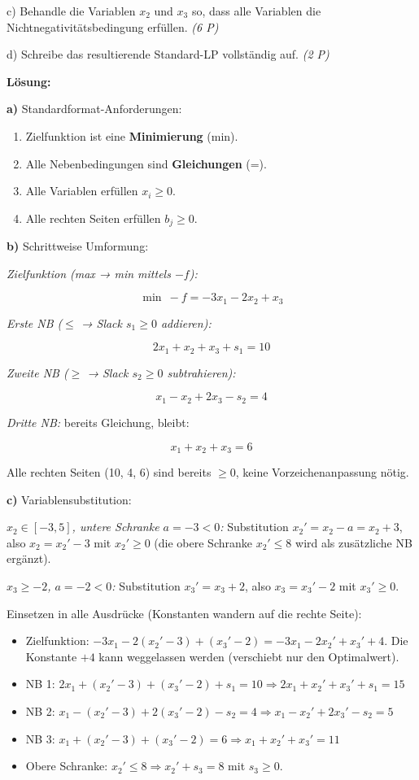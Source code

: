 \documentclass[11pt, a4paper]{article}
\begin{document}
c) Behandle die Variablen $x_2$ und $x_3$ so, dass alle Variablen die Nichtnegativitätsbedingung erfüllen. \textit{(6 P)}

d) Schreibe das resultierende Standard-LP vollständig auf. \textit{(2 P)}


\textbf{Lösung:}


\textbf{a)} Standardformat-Anforderungen:

\begin{enumerate}
  \item Zielfunktion ist eine \textbf{Minimierung} (min).
  \item Alle Nebenbedingungen sind \textbf{Gleichungen} (=).
  \item Alle Variablen erfüllen $x_i \geq 0$.
  \item Alle rechten Seiten erfüllen $b_j \geq 0$.
\end{enumerate}

\textbf{b)} Schrittweise Umformung:


\textit{Zielfunktion (max → min mittels $-f$):}

\[
\min\ -f = -3x_1 - 2x_2 + x_3
\]


\textit{Erste NB ($\leq$ → Slack $s_1 \geq 0$ addieren):}

\[
2x_1 + x_2 + x_3 + s_1 = 10
\]


\textit{Zweite NB ($\geq$ → Slack $s_2 \geq 0$ subtrahieren):}

\[
x_1 - x_2 + 2x_3 - s_2 = 4
\]


\textit{Dritte NB:} bereits Gleichung, bleibt:

\[
x_1 + x_2 + x_3 = 6
\]


Alle rechten Seiten (10, 4, 6) sind bereits $\geq 0$, keine Vorzeichenanpassung nötig.


\textbf{c)} Variablensubstitution:


\textit{$x_2 \in [-3, 5]$, untere Schranke $a = -3 < 0$:} Substitution $x_2' = x_2 - a = x_2 + 3$, also $x_2 = x_2' - 3$ mit $x_2' \geq 0$ (die obere Schranke $x_2' \leq 8$ wird als zusätzliche NB ergänzt).


\textit{$x_3 \geq -2$, $a = -2 < 0$:} Substitution $x_3' = x_3 + 2$, also $x_3 = x_3' - 2$ mit $x_3' \geq 0$.


Einsetzen in alle Ausdrücke (Konstanten wandern auf die rechte Seite):


\begin{itemize}
  \item Zielfunktion: $-3x_1 - 2(x_2' - 3) + (x_3' - 2) = -3x_1 - 2x_2' + x_3' + 4$. Die Konstante $+4$ kann weggelassen werden (verschiebt nur den Optimalwert).
  \item NB 1: $2x_1 + (x_2' - 3) + (x_3' - 2) + s_1 = 10 \Rightarrow 2x_1 + x_2' + x_3' + s_1 = 15$
  \item NB 2: $x_1 - (x_2' - 3) + 2(x_3' - 2) - s_2 = 4 \Rightarrow x_1 - x_2' + 2x_3' - s_2 = 5$
  \item NB 3: $x_1 + (x_2' - 3) + (x_3' - 2) = 6 \Rightarrow x_1 + x_2' + x_3' = 11$
  \item Obere Schranke: $x_2' \leq 8 \Rightarrow x_2' + s_3 = 8$ mit $s_3 \geq 0$.
\end{itemize}
\end{document}
